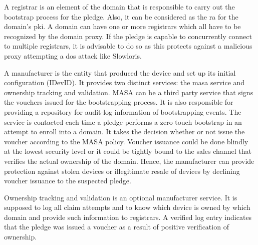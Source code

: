 \par
A registrar is an element of the domain that is responsible to carry out the bootstrap process for the pledge. Also, it can be considered as the \gls{ra} for the domain's \gls{pki}. A domain can have one or more registrars which all have to be recognized by the domain proxy. If the pledge is capable to concurrently connect to multiple registrars, it is advisable to do so as this protects against a malicious proxy attempting a \gls{dos} attack like Slowloris.
\par
A manufacturer is the entity that produced the device and set up its initial configuration (IDevID). It provides two distinct services: the \gls{masa} service and ownership tracking and validation.
MASA can be a third party service that signs the vouchers issued for the bootstrapping process. It is also responsible for providing a repository for audit-log information of bootstrapping events. The service is contacted each time a pledge performs a zero-touch bootstrap in an attempt to enroll into a domain. It takes the decision whether or not issue the voucher according to the MASA policy. Voucher issuance could be done blindly at the lowest security level or it could be tightly bound to the sales channel that verifies the actual ownership of the domain. Hence, the manufacturer can provide protection against stolen devices or illegitimate resale of devices by declining voucher issuance to the suspected pledge.

Ownership tracking and validation is an optional manufacturer service. It is supposed to log all claim attempts and to know which device is owned by which domain and provide such information to registrars.  A verified log entry indicates that the pledge was issued a voucher as a result of positive verification of ownership.